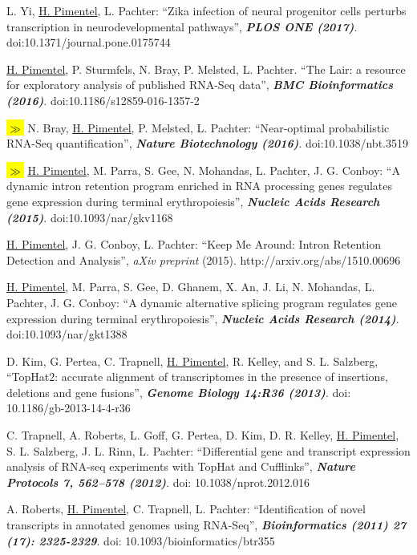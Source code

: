\documentclass[11pt,notitlepage]{article} %
\newcommand{\hlc}[2][blue]{ {\sethlcolor{#1} \hl{#2}} }
\newcommand{\hlpub}{\hlc[Dandelion]{{\color{white}$\gg$} }}
\begin{document}
\begin{etaremune}
  \item L. Yi, \underline{H. Pimentel}, L. Pachter: ``Zika infection of neural progenitor cells perturbs transcription in neurodevelopmental pathways'', {\bf \emph{PLOS ONE (2017)}}. doi:10.1371/journal.pone.0175744

  \item \underline{H. Pimentel}, P. Sturmfels, N. Bray, P. Melsted, L. Pachter. ``The Lair: a resource for exploratory analysis of published RNA-Seq data'', {\bf \emph{BMC Bioinformatics (2016)}}. doi:10.1186/s12859-016-1357-2

  \item \hlpub{} N. Bray, \underline{H. Pimentel}, P. Melsted, L. Pachter: ``Near-optimal probabilistic RNA-Seq quantification'', {\bf \emph{Nature Biotechnology (2016)}}. doi:10.1038/nbt.3519

  \item \hlpub{}\underline{H. Pimentel}, M. Parra, S. Gee, N. Mohandas, L. Pachter, J. G. Conboy: ``A dynamic intron retention program enriched in RNA processing genes regulates gene expression during terminal erythropoiesis'', {\bf \emph{Nucleic Acids Research (2015)}}. doi:10.1093/nar/gkv1168

  \item \underline{H. Pimentel}, J. G. Conboy, L. Pachter: ``Keep Me Around: Intron
Retention Detection and Analysis'', {\emph{aXiv preprint} (2015). http://arxiv.org/abs/1510.00696}

  \item \underline{H. Pimentel}, M. Parra, S. Gee, D. Ghanem, X. An, J. Li, N.
Mohandas, L. Pachter, J. G. Conboy: ``A dynamic alternative splicing program
  regulates gene expression during terminal erythropoiesis'', {\bf \emph{Nucleic
    Acids Research (2014)}}. doi:10.1093/nar/gkt1388

  \item D. Kim, G. Pertea, C. Trapnell, \underline{H. Pimentel}, R. Kelley, and S.
L. Salzberg, ``TopHat2: accurate alignment of transcriptomes in the presence of
insertions, deletions and gene fusions'', {\bf \emph{Genome Biology
    14:R36 (2013)}}. doi: 10.1186/gb-2013-14-4-r36

  \item C. Trapnell, A. Roberts, L. Goff, G. Pertea, D. Kim, D. R. Kelley,
\underline{H. Pimentel}, S. L. Salzberg, J. L. Rinn, L. Pachter: ``Differential
gene and transcript expression analysis of RNA-seq experiments with TopHat and
Cufflinks'', {\bf \emph{Nature Protocols 7, 562–578 (2012)}}. doi: 10.1038/nprot.2012.016

\item A. Roberts, \underline{H. Pimentel}, C. Trapnell, L. Pachter: ``Identification
of novel transcripts in annotated genomes using RNA-Seq'', {\bf
  \emph{Bioinformatics (2011) 27 (17): 2325-2329}}. doi: 10.1093/bioinformatics/btr355

\end{etaremune}
\end{document}
